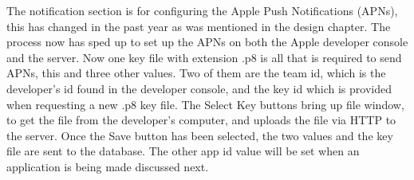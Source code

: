 The notification section is for configuring the Apple Push Notifications (APNs), this has changed in the past year as was mentioned in the design chapter. The process now has sped up to set up the APNs on both the Apple developer console and the server. Now one key file with extension .p8 is all that is required to send APNs, this and three other values. Two of them are the team id, which is the developer's id found in the developer console, and the key id which is provided when requesting a new .p8 key file. The Select Key buttons bring up file window, to get the file from the developer's computer, and uploads the file via HTTP to the server. Once the Save button has been selected, the two values and the key file are sent to the database. The other app id value will be set when an application is being made discussed next.

